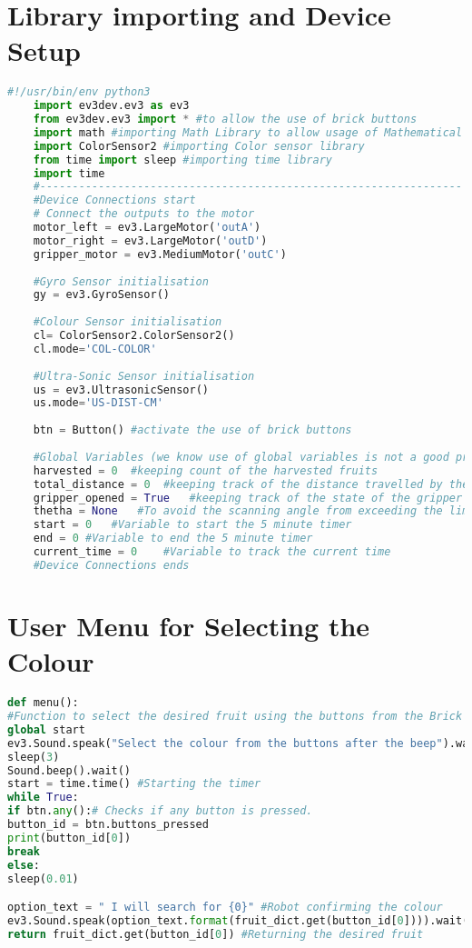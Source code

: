 \vspace{-15mm}
\section{Library importing and Device Setup}\label{app:app1}
\vspace{-7mm}
\begin{lstlisting}[language={python}, caption={Library importing and Device Setup}, label=Initialization]
	#!/usr/bin/env python3
	import ev3dev.ev3 as ev3
	from ev3dev.ev3 import * #to allow the use of brick buttons
	import math #importing Math Library to allow usage of Mathematical functions
	import ColorSensor2 #importing Color sensor library
	from time import sleep #importing time library
	import time
	#-----------------------------------------------------------------
	#Device Connections start
	# Connect the outputs to the motor
	motor_left = ev3.LargeMotor('outA')     
	motor_right = ev3.LargeMotor('outD')
	gripper_motor = ev3.MediumMotor('outC')
	
	#Gyro Sensor initialisation
	gy = ev3.GyroSensor()
	
	#Colour Sensor initialisation
	cl= ColorSensor2.ColorSensor2()
	cl.mode='COL-COLOR'
	
	#Ultra-Sonic Sensor initialisation
	us = ev3.UltrasonicSensor() 
	us.mode='US-DIST-CM'
	
	btn = Button() #activate the use of brick buttons
	
	#Global Variables (we know use of global variables is not a good practice, but in this case it is necessary)
	harvested = 0  #keeping count of the harvested fruits
	total_distance = 0  #keeping track of the distance travelled by the robot
	gripper_opened = True   #keeping track of the state of the gripper
	thetha = None   #To avoid the scanning angle from exceeding the limits
	start = 0   #Variable to start the 5 minute timer
	end = 0 #Variable to end the 5 minute timer
	current_time = 0    #Variable to track the current time
	#Device Connections ends
\end{lstlisting}


\section{User Menu for Selecting the Colour}
\vspace{-7mm}
\begin{lstlisting}[language={python}, caption={User Menu for Selecting the Colour}, label=menu]
def menu():
#Function to select the desired fruit using the buttons from the Brick
global start    
ev3.Sound.speak("Select the colour from the buttons after the beep").wait() 
sleep(3)
Sound.beep().wait()
start = time.time() #Starting the timer
while True:
if btn.any():# Checks if any button is pressed.
button_id = btn.buttons_pressed
print(button_id[0])
break
else:
sleep(0.01)

option_text = " I will search for {0}" #Robot confirming the colour
ev3.Sound.speak(option_text.format(fruit_dict.get(button_id[0]))).wait() 
return fruit_dict.get(button_id[0]) #Returning the desired fruit
\end{lstlisting}

